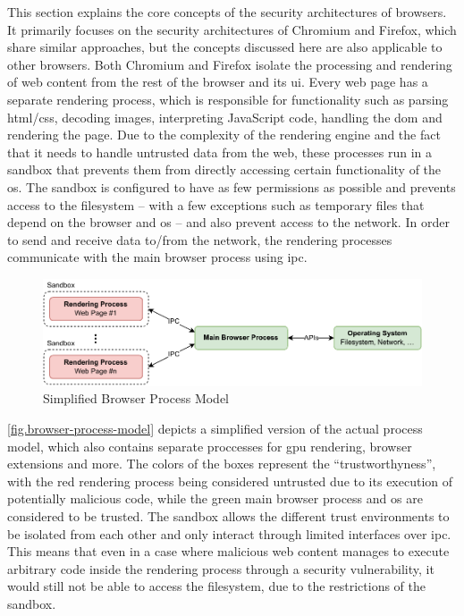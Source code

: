 This section explains the core concepts of the security architectures of browsers. It primarily focuses on the security architectures of Chromium and Firefox, which share similar approaches, but the concepts discussed here are also applicable to other browsers. Both Chromium and Firefox isolate the processing and rendering of web content from the rest of the browser and its \ac{ui}. Every web page has a separate rendering process, which is responsible for functionality such as parsing \acs{html}/\acs{css}, decoding images, interpreting JavaScript code, handling the \ac{dom} and rendering the page. Due to the complexity of the rendering engine and the fact that it needs to handle untrusted data from the web, these processes run in a sandbox that prevents them from directly accessing certain functionality of the \ac{os}. The sandbox is configured to have as few permissions as possible and prevents access to the filesystem – with a few exceptions such as temporary files that depend on the browser and \ac{os} – and also prevent access to the network. In order to send and receive data to/from the network, the rendering processes communicate with the main browser process using \ac{ipc}.~\cite{ChromiumSecArchitecture, MozFFSandbox}

\begin{figure}[H]
    \centering
    \includegraphics[width=16cm]{img/browser-process-model.pdf}
    \caption{Simplified Browser Process Model}
    \label{fig.browser-process-model}
\end{figure}

\autoref{fig.browser-process-model} depicts a simplified version of the actual process model, which also contains separate proccesses for \acs{gpu} rendering, browser extensions and more. The colors of the boxes represent the “trustworthyness”, with the red rendering process being considered untrusted due to its execution of potentially malicious code, while the green main browser process and \ac{os} are considered to be trusted. The sandbox allows the different trust environments to be isolated from each other and only interact through limited interfaces over \acs{ipc}. This means that even in a case where malicious web content manages to execute arbitrary code inside the rendering process through a security vulnerability, it would still not be able to access the filesystem, due to the restrictions of the sandbox. \cite{ChromiumSecArchitecture, MozFFSandbox}
